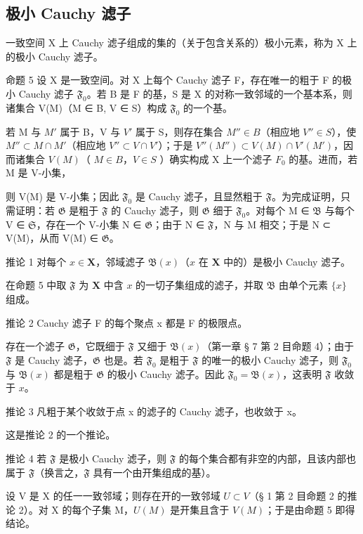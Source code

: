 \subsection{极小 Cauchy 滤子}

一致空间 X 上 Cauchy 滤子组成的集的（关于包含关系的）极小元素，称为 X 上的极小 Cauchy 滤子。

命题 5 设 X 是一致空间。对 X 上每个 Cauchy 滤子 F，存在唯一的粗于 F 的极小 Cauchy 滤子 \(\mathfrak{F}_0\)。若 B 是 F 的基，S 是 X 的对称一致邻域的一个基本系，则诸集合 V(M)（M ∈ B, V ∈ S）构成 \(\mathfrak{F}_0\) 的一个基。

若 M 与 \(M'\) 属于 B，V 与 \(V'\) 属于 S，则存在集合 \(M'' \in B\)（相应地 \(V'' \in S\)），使 \(M'' \subset M \cap M'\)（相应地 \(V'' \subset V \cap V'\)）；于是 \(V''(M'') \subset V(M) \cap V'(M')\)，因而诸集合 \(V(M)\)（ \(M \in B\)，\(V \in S\) ）确实构成 X 上一个滤子 \(F_0\) 的基。进而，若 M 是 V-小集，

则 V(M) 是 V-小集；因此 \(\mathfrak{F}_0\) 是 Cauchy 滤子，且显然粗于 \(\mathfrak{F}\)。为完成证明，只需证明：若 \(\mathfrak{G}\) 是粗于 \(\mathfrak{F}\) 的 Cauchy 滤子，则 \(\mathfrak{G}\) 细于 \(\mathfrak{F}_0\)。对每个 M ∈ \(\mathfrak{B}\) 与每个 V ∈ \(\mathfrak{S}\)，存在一个 V-小集 N ∈ \(\mathfrak{G}\)；由于 N ∈ \(\mathfrak{F}\)，N 与 M 相交；于是 N ⊂ V(M)，从而 V(M) ∈ \(\mathfrak{G}\)。

推论 1 对每个 \(x \in \mathbf{X}\)，邻域滤子 \(\mathfrak{B}(x)\)（\(x\) 在 \(\mathbf{X}\) 中的）是极小 Cauchy 滤子。

在命题 5 中取 \(\mathfrak{F}\) 为 \(\mathbf{X}\) 中含 \(x\) 的一切子集组成的滤子，并取 \(\mathfrak{B}\) 由单个元素 \(\{x\}\) 组成。

推论 2 Cauchy 滤子 F 的每个聚点 x 都是 F 的极限点。

存在一个滤子 \(\mathfrak{G}\)，它既细于 \(\mathfrak{F}\) 又细于 \(\mathfrak{B}(x)\)（第一章 § 7 第 2 目命题 4）；由于 \(\mathfrak{F}\) 是 Cauchy 滤子，\(\mathfrak{G}\) 也是。若 \(\mathfrak{F}_0\) 是粗于 \(\mathfrak{F}\) 的唯一的极小 Cauchy 滤子，则 \(\mathfrak{F}_0\) 与 \(\mathfrak{B}(x)\) 都是粗于 \(\mathfrak{G}\) 的极小 Cauchy 滤子。因此 \(\mathfrak{F}_0 = \mathfrak{B}(x)\)，这表明 \(\mathfrak{F}\) 收敛于 \(x\)。

推论 3 凡粗于某个收敛于点 x 的滤子的 Cauchy 滤子，也收敛于 x。

这是推论 2 的一个推论。

推论 4 若 \(\mathfrak{F}\) 是极小 Cauchy 滤子，则 \(\mathfrak{F}\) 的每个集合都有非空的内部，且该内部也属于 \(\mathfrak{F}\)（换言之，\(\mathfrak{F}\) 具有一个由开集组成的基）。

设 V 是 X 的任一一致邻域；则存在开的一致邻域 \(U \subset V\)（§ 1 第 2 目命题 2 的推论 2）。对 X 的每个子集 M，\(U(M)\) 是开集且含于 \(V(M)\)；于是由命题 5 即得结论。

